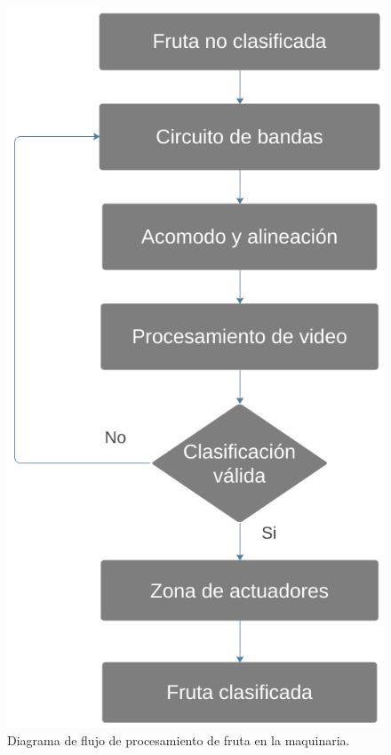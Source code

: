 \documentclass[twoside,spanish,ESP,MSc]{plantillaLabUPV}
\theoremstyle{definition}
\begin{document}
\begin{figure} [!tbh]
	\centering
	\includegraphics[height=0.5\textheight]{edrawimas/diagramaflujomaquina}
	\caption{Diagrama de flujo de procesamiento de fruta en la maquinaria.}
	\label{fig:diagramaflujomaquina}
\end{figure}
\end{document}

